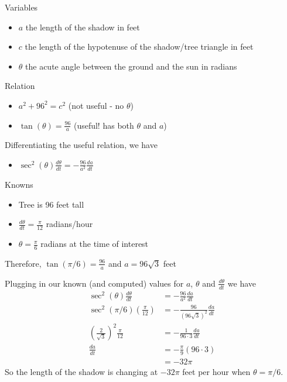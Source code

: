 \documentclass{ximera}
\begin{document}
\begin{exercise}
\begin{hint}
Variables

\begin{itemize}
\item
  $a$ the length of the shadow in feet
\item
  $c$ the length of the hypotenuse of the shadow/tree triangle in feet
\item
  $\theta$ the acute angle between the ground and the sun in radians
\end{itemize}

Relation

\begin{itemize}
\item
  $a^2+96^2 = c^2$ (not useful - no $\theta$)
\item
  $\tan(\theta) = \frac{96}{a}$ (useful! has both $\theta$ and $a$)
\end{itemize}

Differentiating the useful relation, we have

\begin{itemize}
\itemsep1pt\parskip0pt
\item
  $\sec^2(\theta)\frac{d\theta}{dt} = -\frac{96}{a^2}\frac{da}{dt}$
\end{itemize}

Knowns

\begin{itemize}
\item
  Tree is 96 feet tall
\item
  $\frac{d\theta}{dt} = \frac{\pi}{12}$ radians/hour
\item
  $\theta = \frac{\pi}{6}$ radians at the time of interest
\end{itemize}

Therefore, $\tan(\pi/6) = \frac{96}{a}$ and $a = 96\sqrt{3}$ feet

Plugging in our known (and computed) values for $a$, $\theta$ and
$\frac{d\theta}{dt}$ we have \begin{align*}
\sec^2(\theta)\frac{d\theta}{dt} &= -\frac{96}{a^2}\frac{da}{dt}\\
\sec^2(\pi/6)\left(\frac{\pi}{12}\right) &= -\frac{96}{(96\sqrt{3})^2}\frac{da}{dt} \\
\left(\frac{2}{\sqrt{3}}\right)^2\frac{\pi}{12} &= -\frac{1}{96\cdot 3}\frac{da}{dt} \\
\frac{da}{dt} &= -\frac{\pi}{9}\left(96\cdot 3\right)  \\
&= -32\pi
\end{align*} So the length of the shadow is changing at $-32\pi$ feet
per hour when $\theta = \pi/6$.
\end{hint}


\begin{multipleChoice}
\end{multipleChoice}

\end{exercise}
\end{document}

